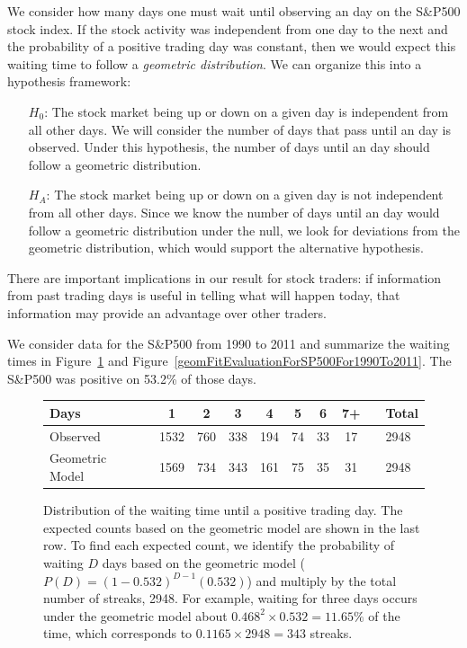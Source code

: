 We consider how many days one must wait until observing an  day on the S\&P500 stock index. If the stock activity was independent from one day to the next and the probability of a positive trading day was constant, then we would expect this waiting time to follow a \emph{geometric distribution}. We can organize this into a hypothesis framework:
\begin{itemize}
\item[$H_0$:] The stock market being up or down on a given day is independent from all other days. We will consider the number of days that pass until an  day is observed. Under this hypothesis, the number of days until an  day should follow a geometric distribution.
\item[$H_A$:] The stock market being up or down on a given day is not independent from all other days. Since we know the number of days until an  day would follow a geometric distribution under the null, we look for deviations from the geometric distribution, which would support the alternative hypothesis.
\end{itemize}
There are important implications in our result for stock traders: if information from past trading days is useful in telling what will happen today, that information may provide an advantage over other traders.

We consider data for the S\&P500 from 1990 to 2011 and summarize the waiting times in Figure~\ref{sAndP500For1990To2011TimeToPosTrade2} and Figure~\ref{geomFitEvaluationForSP500For1990To2011}. The S\&P500 was positive on 53.2\% of those days.

\begin{figure}
\centering
\begin{tabular}{ll ccc ccc c ll}
\hline
Days	 & \hspace{1mm} & 1 & 2 & 3 & 4 & 5 & 6 & 7+ & \hspace{1mm} & Total \\
\hline
Observed &		& 1532 & 760 & 338 & 194 & 74 & 33 & 17 & & 2948 \\
Geometric Model &		& 1569 & 734 & 343 & 161 & 75 & 35 & 31 & & 2948 \\
\hline
\end{tabular}
\caption{Distribution of the waiting time until a positive trading day. The expected counts based on the geometric model are shown in the last row. To find each expected count, we identify the probability of waiting $D$ days based on the geometric model ($P(D) = (1-0.532)^{D-1}(0.532)$) and multiply by the total number of streaks, 2948. For example, waiting for three days occurs under the geometric model about $0.468^2\times 0.532 = 11.65\%$ of the time, which corresponds to $0.1165\times 2948 = 343$ streaks.}
\label{sAndP500For1990To2011TimeToPosTrade2}
\end{figure}

